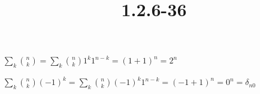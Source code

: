 \documentclass{article}
\title{1.2.6-36}
\begin{document}
\maketitle

$\sum_k \binom{n}{k} = \sum_k \binom{n}{k} 1^k1^{n-k} = (1+1)^n = 2^n$

$\sum_k \binom{n}{k}(-1)^k = \sum_k \binom{n}{k} (-1)^k1^{n-k} = (-1+1)^n = 0^n = \delta_{n0}$
\end{document}
